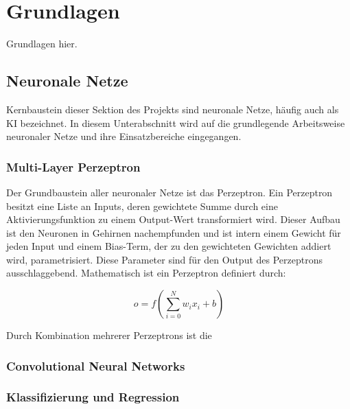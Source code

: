 
\section{Grundlagen}
\label{sec:ki:grundlagen}

Grundlagen hier.

\subsection{Neuronale Netze}
\label{sec:neuronale_letze}

Kernbaustein dieser Sektion des Projekts sind neuronale Netze, häufig auch als \ac{KI} bezeichnet. In diesem Unterabschnitt wird auf die grundlegende Arbeitsweise neuronaler Netze und ihre Einsatzbereiche eingegangen.

\subsubsection{Multi-Layer Perzeptron}
\label{sec:multi_layer_perceptron}

Der Grundbaustein aller neuronaler Netze ist das Perzeptron. Ein Perzeptron besitzt eine Liste an Inputs, deren gewichtete Summe durch eine Aktivierungsfunktion zu einem Output-Wert transformiert wird. Dieser Aufbau ist den Neuronen in Gehirnen nachempfunden und ist intern einem Gewicht für jeden Input und einem Bias-Term, der zu den gewichteten Gewichten addiert wird, parametrisiert. Diese Parameter sind für den Output des Perzeptrons ausschlaggebend. Mathematisch ist ein Perzeptron definiert durch:

\[ o = f \left(\sum_{i=0}^{N} w_i x_i + b \right) \]

Durch Kombination mehrerer Perzeptrons ist die 


\subsubsection{Convolutional Neural Networks}
\label{sec:cnn}


\subsubsection{Klassifizierung und Regression}
\label{sec:klassifizierung_regression}

